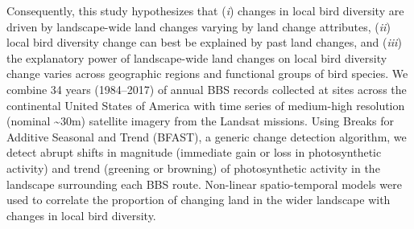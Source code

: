 Consequently, this study hypothesizes that (\textit{i}) changes in local bird diversity are driven by landscape-wide land changes varying by land change attributes, (\textit{ii}) local bird diversity change can best be explained by past land changes, and (\textit{iii}) the explanatory power of landscape-wide land changes on local bird diversity change varies across geographic regions and functional groups of bird species. We combine 34 years (1984–2017) of annual BBS records collected at sites across the continental United States of America with time series of medium-high resolution (nominal \textasciitilde30m) satellite imagery from the Landsat missions. Using Breaks for Additive Seasonal and Trend (BFAST), a generic change detection algorithm, we detect abrupt shifts in magnitude (immediate gain or loss in photosynthetic activity) and trend (greening or browning) of photosynthetic activity in the landscape surrounding each BBS route. Non-linear spatio-temporal models were used to correlate the proportion of changing land in the wider landscape with changes in local bird diversity.
